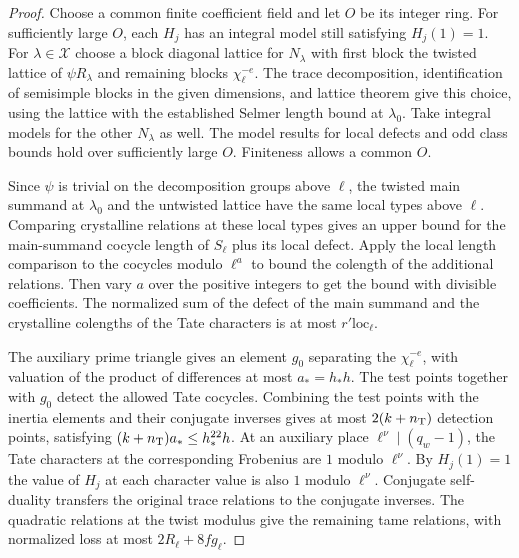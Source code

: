\begin{proof}
Choose a common finite coefficient field and let $O$ be its integer ring.
For sufficiently large $O$, each $H_j$ has an integral model still satisfying $H_j(1)=1$.
For $\lambda\in\mathcal X$ choose a block diagonal lattice for $N_\lambda$ with first block the twisted lattice of $\psi R_\lambda$ and remaining blocks $\chi_\ell^{-e}$. The trace decomposition, identification of semisimple blocks in the given dimensions, and lattice theorem give this choice, using the lattice with the established Selmer length bound at $\lambda_0$.
Take integral models for the other $N_\lambda$ as well. The model results for local defects and odd class bounds hold over sufficiently large $O$. Finiteness allows a common $O$.

Since $\psi$ is trivial on the decomposition groups above $\ell$, the twisted main summand at $\lambda_0$ and the untwisted lattice have the same local types above $\ell$.
Comparing crystalline relations at these local types gives an upper bound for the main-summand cocycle length of $S_\ell$ plus its local defect. Apply the local length comparison to the cocycles modulo $\ell^a$ to bound the colength of the additional relations. Then vary $a$ over the positive integers to get the bound with divisible coefficients.
The normalized sum of the defect of the main summand and the crystalline colengths of the Tate characters is at most $r'\mathrm{loc}_\ell$.

The auxiliary prime triangle gives an element $g_0$ separating the $\chi_\ell^{-e}$, with valuation of the product of differences at most $a_*=h_*h$. The test points together with $g_0$ detect the allowed Tate cocycles.
Combining the test points with the inertia elements and their conjugate inverses gives at most $2(k+n_{\rm T})$ detection points, satisfying $(k+n_{\rm T})a_*\le h_*^{22}h$.
At an auxiliary place $\ell^\nu\mid(q_w-1)$, the Tate characters at the corresponding Frobenius are $1$ modulo $\ell^\nu$. By $H_j(1)=1$ the value of $H_j$ at each character value is also $1$ modulo $\ell^\nu$.
Conjugate self-duality transfers the original trace relations to the conjugate inverses. The quadratic relations at the twist modulus give the remaining tame relations, with normalized loss at most $2R_\ell+8f g_\ell$.


\end{proof}
